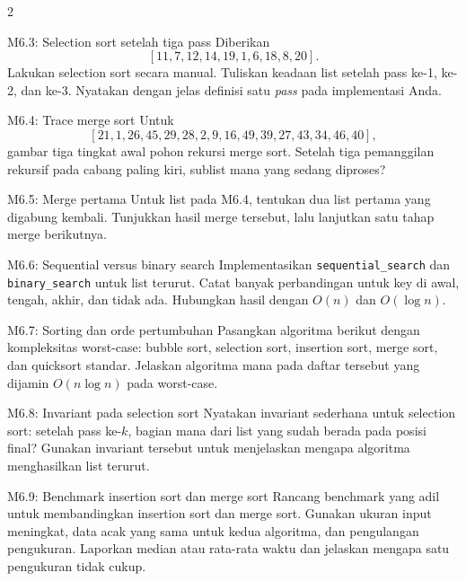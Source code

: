 \documentclass[9pt,a4paper]{article}
\begin{document}
\begin{multicols}{2}
\begin{qbox}[L3]{M6.3: Selection sort setelah tiga pass}
Diberikan
\[
[11,7,12,14,19,1,6,18,8,20].
\]
Lakukan selection sort secara manual. Tuliskan keadaan list setelah pass ke-1, ke-2, dan ke-3. Nyatakan dengan jelas definisi satu \emph{pass} pada implementasi Anda.
\end{qbox}

\begin{qbox}[L3]{M6.4: Trace merge sort}
Untuk
\[
[21,1,26,45,29,28,2,9,16,49,39,27,43,34,46,40],
\]
gambar tiga tingkat awal pohon rekursi merge sort. Setelah tiga pemanggilan rekursif pada cabang paling kiri, sublist mana yang sedang diproses?
\end{qbox}

\begin{qbox}[L3]{M6.5: Merge pertama}
Untuk list pada M6.4, tentukan dua list pertama yang digabung kembali. Tunjukkan hasil merge tersebut, lalu lanjutkan satu tahap merge berikutnya.
\end{qbox}

\begin{qbox}[L3]{M6.6: Sequential versus binary search}
Implementasikan \texttt{sequential\_search} dan \texttt{binary\_search} untuk list terurut. Catat banyak perbandingan untuk key di awal, tengah, akhir, dan tidak ada. Hubungkan hasil dengan $O(n)$ dan $O(\log n)$.
\end{qbox}

\begin{qbox}[L3]{M6.7: Sorting dan orde pertumbuhan}
Pasangkan algoritma berikut dengan kompleksitas worst-case: bubble sort, selection sort, insertion sort, merge sort, dan quicksort standar. Jelaskan algoritma mana pada daftar tersebut yang dijamin $O(n\log n)$ pada worst-case.
\end{qbox}

\begin{qbox}[L4]{M6.8: Invariant pada selection sort}
Nyatakan invariant sederhana untuk selection sort: setelah pass ke-$k$, bagian mana dari list yang sudah berada pada posisi final? Gunakan invariant tersebut untuk menjelaskan mengapa algoritma menghasilkan list terurut.
\end{qbox}

\begin{qbox}[L4]{M6.9: Benchmark insertion sort dan merge sort}
Rancang benchmark yang adil untuk membandingkan insertion sort dan merge sort. Gunakan ukuran input meningkat, data acak yang sama untuk kedua algoritma, dan pengulangan pengukuran. Laporkan median atau rata-rata waktu dan jelaskan mengapa satu pengukuran tidak cukup.
\end{qbox}


\end{multicols}
\end{document}
